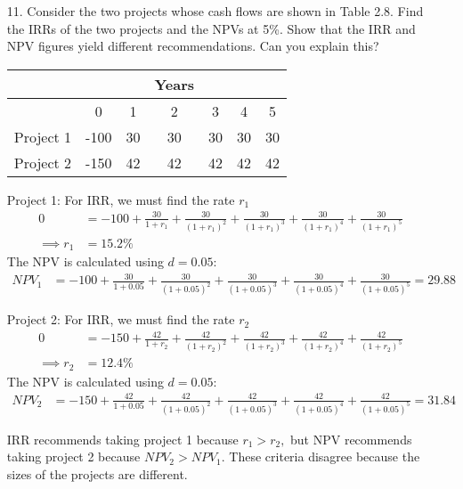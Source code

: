 \documentclass{article}
\begin{document}
\begin{itemize}
	\item[11.] Consider the two projects whose cash flows are shown in Table 2.8. Find the IRRs of the two projects and the NPVs at 5\%. Show that the IRR and NPV figures yield different recommendations. Can you explain this?
		\begin{center}
			\begin{tabular}{lcccccc}
				& & & Years & & & \\
				\hline
				& 0 & 1 & 2 & 3 & 4 & 5 \\
				\hline
				Project 1 & -100 & 30 & 30 & 30 & 30 & 30 \\
				Project 2 & -150 & 42 & 42 & 42 & 42 & 42 \\
				\hline
			\end{tabular}
		\end{center}
		\begin{soln}
			Project 1: For IRR, we must find the rate $r_1$
			\begin{align*}
				0 &= -100 + \frac{30}{1+r_1} + \frac{30}{(1+r_1)^2} + \frac{30}{(1+r_1)^3} + \frac{30}{(1+r_1)^4} + \frac{30}{(1+r_1)^5} \\
				\implies r_1 &= 15.2\%
			\end{align*}
			The NPV is calculated using $d=0.05:$
			\begin{align*}
				NPV_1 &= -100 + \frac{30}{1+0.05} + \frac{30}{(1+0.05)^2} + \frac{30}{(1+0.05)^3} + \frac{30}{(1+0.05)^4} + \frac{30}{(1+0.05)^5} = 29.88
			\end{align*}

			Project 2: For IRR, we must find the rate $r_2$ 
			\begin{align*}
				0 &= -150 + \frac{42}{1+r_2} + \frac{42}{(1+r_2)^2} + \frac{42}{(1+r_2)^3} + \frac{42}{(1+r_2)^4} + \frac{42}{(1+r_2)^5} \\
				\implies r_2 &= 12.4\%
			\end{align*}
			The NPV is calculated using $d=0.05:$
			\begin{align*}
				NPV_2 &= -150 + \frac{42}{1+0.05} + \frac{42}{(1+0.05)^2} + \frac{42}{(1+0.05)^3} + \frac{42}{(1+0.05)^4} + \frac{42}{(1+0.05)^5} = 31.84
			\end{align*}

			IRR recommends taking project 1 because $r_1>r_2,$ but NPV recommends taking project 2 because $NPV_2>NPV_1.$ These criteria disagree because the sizes of the projects are different. 
		\end{soln}


\end{itemize}
\end{document}
